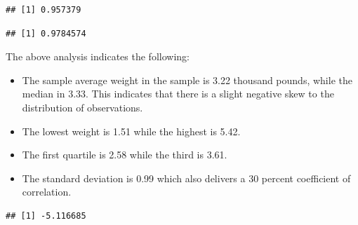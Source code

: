 \documentclass[
]{book}
\newenvironment{Shaded}{\begin{snugshade}}{\end{snugshade}}
\newcommand{\CommentTok}[1]{\textcolor[rgb]{0.56,0.35,0.01}{\textit{#1}}}
\newcommand{\FunctionTok}[1]{\textcolor[rgb]{0.00,0.00,0.00}{#1}}
\newcommand{\NormalTok}[1]{#1}
\newcommand{\SpecialCharTok}[1]{\textcolor[rgb]{0.00,0.00,0.00}{#1}}
\begin{document}
\begin{Shaded}
\end{Shaded}

\begin{verbatim}
## [1] 0.957379
\end{verbatim}

\begin{Shaded}
\end{Shaded}

\begin{verbatim}
## [1] 0.9784574
\end{verbatim}

The above analysis indicates the following:

\begin{itemize}
\item
  The sample average weight in the sample is 3.22 thousand pounds, while the median in 3.33. This indicates that there is a slight negative skew to the distribution of observations.
\item
  The lowest weight is 1.51 while the highest is 5.42.
\item
  The first quartile is 2.58 while the third is 3.61.
\item
  The standard deviation is 0.99 which also delivers a 30 percent coefficient of correlation.
\end{itemize}

\begin{Shaded}
\end{Shaded}

\begin{verbatim}
## [1] -5.116685
\end{verbatim}

\begin{Shaded}
\end{Shaded}
\end{document}
